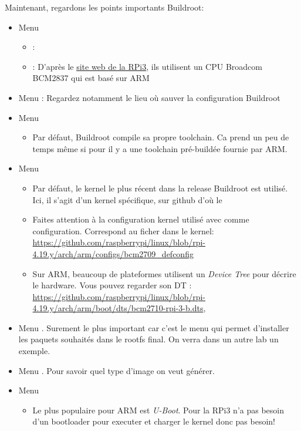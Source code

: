 Maintenant, regardons les points importants Buildroot:
\begin{itemize}
\item Menu 
  \begin{itemize}
  \item {} : 
  \item {} : D'après le
    \href{https://www.raspberrypi.org/products/raspberry-pi-3-model-b/}{site web de la RPi3},
    ils utilisent un CPU Broadcom BCM2837 qui est basé sur ARM 
  \end{itemize}
\item Menu  : Regardez notamment le lieu où sauver la
  configuration Buildroot
\item Menu 
  \begin{itemize}
  \item Par défaut, Buildroot compile sa propre toolchain. Ca prend un peu
    de temps même si pour  il y a une toolchain pré-buildée fournie par
    ARM.%
  \end{itemize}
\item Menu 
  \begin{itemize}
  \item Par défaut, le kernel le plus récent dans la release Buildroot est
    utilisé. Ici, il s'agit d'un kernel spécifique, sur github d'où le
  \item Faites attention à la configuration kernel utilisé
     avec  comme
    configuration. Correspond au ficher  dans le
    kernel: \url{https://github.com/raspberrypi/linux/blob/rpi-4.19.y/arch/arm/configs/bcm2709_defconfig}
  \item Sur ARM, beaucoup de plateformes utilisent un {\em Device Tree} pour
    décrire le hardware. Vous pouvez regarder son DT :
    \url{https://github.com/raspberrypi/linux/blob/rpi-4.19.y/arch/arm/boot/dts/bcm2710-rpi-3-b.dts},
  \end{itemize}

\item Menu . Surement le plus important
  car c'est le menu qui permet d'installer les paquets souhaités dans
  le rootfs final. On verra dans un autre lab un exemple.
\item Menu . Pour savoir quel type d'image on veut
  générer.
\item Menu 
  \begin{itemize}
  \item Le plus populaire pour ARM est {\em U-Boot}. Pour la RPi3 n'a pas
    besoin d'un bootloader pour executer et charger le kernel donc pas besoin!
  \end{itemize}

\end{itemize}

